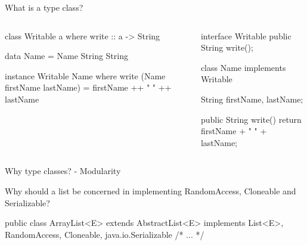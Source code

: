 \documentclass[13pt]{beamer}
\begin{document}
\begin{frame}[fragile]{What is a type class?}
   
  \begin{columns}[c]
    \hspace{-10pt}
      \begin{haskellCode}
        class Writable a where
          write :: a -> String




        data Name = Name String String

        instance Writable Name where
          write (Name firstName lastName) =
            firstName ++ " " ++ lastName
      \end{haskellCode}

      \begin{javaCode}
        interface Writable {
          public String write();
        }


        
        class Name implements Writable {
          String firstName, lastName;

          public String write(){
            return firstName + " " + lastName;
          }
        }
      \end{javaCode}
  \end{columns}







\end{frame}

\begin{frame}[fragile]{Why type classes? - Modularity}
  \note{
  }

  Why should a list be concerned in implementing RandomAccess, Cloneable and Serializable? \\

  \begin{javaCode}
    public class ArrayList<E> extends AbstractList<E>
        implements List<E>, RandomAccess, Cloneable, java.io.Serializable {
        /* ... */
      }
  \end{javaCode}
\end{frame}
\end{document}

